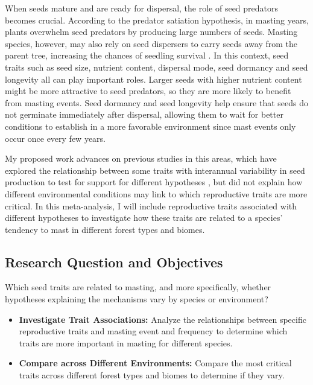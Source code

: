 \documentclass[11pt,letter]{article}
\begin{document}
When seeds mature and are ready for dispersal, the role of seed predators becomes crucial. According to the predator satiation hypothesis, in masting years, plants overwhelm seed predators by producing large numbers of seeds. Masting species, however, may also rely on seed dispersers to carry seeds away from the parent tree, increasing the chances of seedling survival \citep{janzen1971seed, silvertown1980evolutionary}. In this context, seed traits such as seed size, nutrient content, dispersal mode, seed dormancy and seed longevity all can play important roles. Larger seeds with higher nutrient content might be more attractive to seed predators, so they are more likely to benefit from masting events. Seed dormancy and seed longevity help ensure that seeds do not germinate immediately after dispersal, allowing them to wait for better conditions to establish in a more favorable environment since mast events only occur once every few years.\par
My proposed work advances on previous studies in this areas, which have explored the relationship between some traits with interannual variability in seed production to test for support for different hypotheses \citep{fernandez2019nutrient, journe2023evolution, pearse2020biogeography}, but did not explain how different environmental conditions may link to which reproductive traits are more critical. In this meta-analysis, I will include reproductive traits associated with different hypotheses to investigate how these traits are related to a species' tendency to mast in different forest types and biomes.\par
\subsection{Research Question and Objectives}
Which seed traits are related to masting, and more specifically, whether hypotheses explaining the mechanisms vary by species or environment?
	\begin{itemize}
	\item \textbf{Investigate Trait Associations:} Analyze the relationships between specific reproductive traits and masting event and frequency to determine which traits are more important in masting for different species.
	\item \textbf{Compare across Different Environments:} Compare the most critical traits across different forest types and biomes to determine if they vary.
	\end{itemize}
\end{document}
